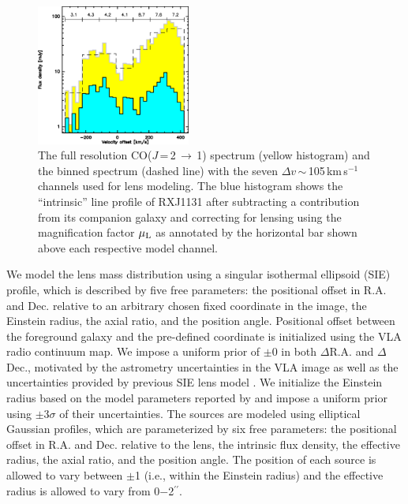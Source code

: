 \documentclass[]{emulateapj}
\newcommand{\rarr}{$\rightarrow$}
\newcommand{\bco}{\mbox{CO($J$\,=\,2\,\rarr\,1)}\xspace}
\newcommand{\kms}{\mbox{km\,s$^{-1}$}\xspace}
\begin{document}
\begin{figure}[!htbp]
\includegraphics[width=0.45\textwidth]{f5.eps}
\caption{The full resolution \bco spectrum (yellow histogram) and
the binned spectrum (dashed line) with the seven $\Delta v$\,$\sim$\,105\,\kms channels used for lens modeling. The
blue histogram shows the ``intrinsic'' line profile of RXJ1131
after subtracting a contribution from its companion galaxy and
correcting for lensing using the magnification factor $\mu_{\rm L}$ as annotated by the horizontal bar shown
above each respective model channel.
\label{fig:delensed}}
\end{figure}

We model the lens mass distribution using a singular isothermal
ellipsoid (SIE) profile, which is described by five free parameters: the
positional offset in R.A. and Dec. relative to an arbitrary chosen
fixed coordinate in the image, the Einstein radius, the axial ratio, and the
position angle.
Positional offset between the foreground galaxy and the pre-defined coordinate is initialized
using the VLA radio continuum map.
We impose a
uniform prior of $\pm$0 in both $\Delta$R.A. and $\Delta$Dec.,
motivated by the astrometry uncertainties in the VLA image as well as
the uncertainties provided by previous SIE lens model .
We initialize the Einstein radius based on the model parameters reported by 
and impose a uniform prior using $\pm$3$\sigma$ of their uncertainties.
The sources are modeled using elliptical Gaussian profiles, which are
parameterized by six free parameters: the positional offset in R.A.
and Dec. relative to the lens, the intrinsic flux density, the effective
radius, the axial ratio, and the position angle. The position of each source
is allowed to vary between $\pm$1 (i.e., within the Einstein radius)
and the effective radius is allowed to vary from 0$-$2$^{\prime\prime}$.
\end{document}
